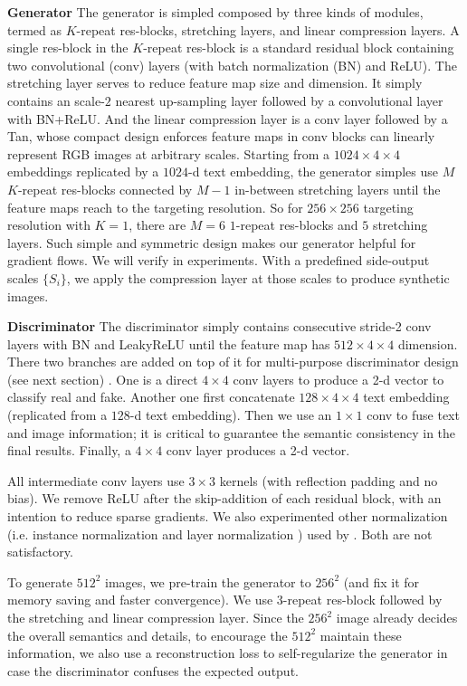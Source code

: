 \documentclass[10pt,twocolumn,letterpaper]{article}
\begin{document}
\textbf{Generator} The generator is simpled composed by three kinds of modules, termed as $K$-repeat res-blocks, stretching layers, and linear compression layers.
A single res-block in the $K$-repeat res-block is a standard residual block  \cite{he2016identity} containing two convolutional (conv) layers (with batch normalization (BN) \cite{ioffe2015batch} and ReLU). The stretching layer serves to reduce feature map size and dimension. It simply contains an scale-$2$ nearest up-sampling layer followed by a convolutional layer with BN+ReLU. And the linear compression layer is a conv layer followed by a Tan, whose compact design enforces feature maps in conv blocks can linearly represent RGB images at arbitrary scales.
Starting from a $1024{\times}4{\times}4$ embeddings replicated by a $1024$-d text embedding, the generator simples use $M$ $K$-repeat res-blocks connected by $M{-}1$ in-between stretching layers until the feature maps reach to the targeting resolution. So for $256{\times}256$ targeting resolution with $K{=}1$, there are $M{=}6$ $1$-repeat res-blocks and $5$ stretching layers. Such simple and symmetric design makes our generator helpful for gradient flows. We will verify in experiments. 
With a predefined side-output scales $\{S_i\}$, we apply the compression layer at those scales to produce synthetic images.

\textbf{Discriminator} The discriminator simply contains consecutive stride-2 conv layers with BN and LeakyReLU until the feature map has $512{\times}4{\times}4$ dimension. There two branches are added on top of it for multi-purpose discriminator design (see next section) . One is a direct $4{\times}4$ conv layers to produce a 2-d vector to classify real and fake. Another one first concatenate $128{\times}4{\times}4$ text embedding (replicated from a $128$-d text embedding). Then we use an $1{\times}1$ conv to fuse text and image information; it is critical to guarantee the semantic consistency in the final results. Finally, a $4{\times}4$ conv layer produces a 2-d vector.

All intermediate conv layers use $3{\times}3$ kernels (with reflection padding and no bias). We remove ReLU after the skip-addition of each residual block, with an intention to reduce sparse gradients. 
We also experimented other normalization (i.e. instance normalization \cite{ulyanov2016instance} and layer normalization \cite{ba2016layer}) used by \cite{zhu2017unpaired,chen2017photographic}. Both are not satisfactory. 

To generate $512^2$ images, we pre-train the generator to $256^2$ (and fix it for memory saving and faster convergence). We use $3$-repeat res-block followed by the stretching and linear compression layer. Since the $256^2$ image already decides the overall semantics and details, to encourage the $512^2$ maintain these information, we also use a reconstruction loss to self-regularize the generator in case the discriminator confuses the expected output.
\end{document}

